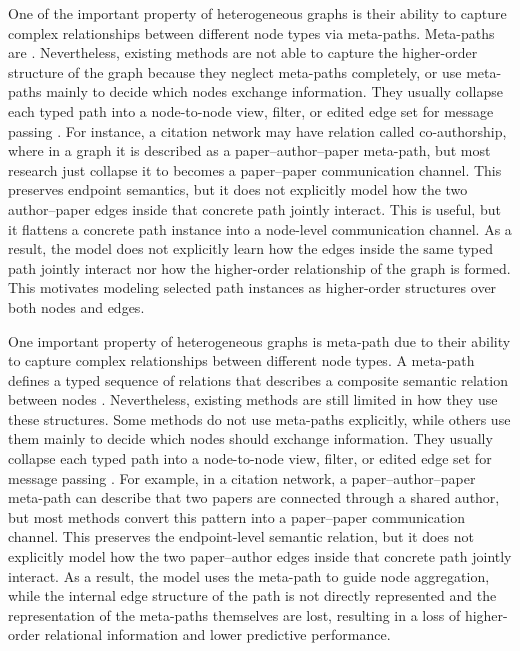 One of the important property of heterogeneous graphs is their ability to capture complex relationships between different node types via meta-paths. Meta-paths are \cite{sun2011pathsim}. Nevertheless, existing methods are not able to capture the higher-order structure of the graph because they neglect meta-paths completely, or use meta-paths mainly to decide which nodes exchange information. They  usually collapse each typed path into a node-to-node view, filter, or edited edge set for message passing \cite{lu2026addressing,chen2025adaptive,li2025hetero2net,guo2023homophily,shen2025heterophily,wang2025homophily}. For instance, a citation network may have relation called co-authorship, where in a graph it is described as a paper--author--paper meta-path, but most research just collapse it to becomes a paper--paper communication channel. 
This preserves endpoint semantics, but it does not explicitly model how the two author--paper edges inside that concrete path jointly interact.  This is useful, but it flattens a concrete path instance into a node-level communication channel. As a result, the model does not explicitly learn how the edges inside the same typed path jointly interact nor how the higher-order relationship of the graph is formed. This motivates modeling selected path instances as higher-order structures over both nodes and edges.



One important property of heterogeneous graphs is meta-path due to  their ability to capture complex relationships between different node types. 
A meta-path defines a typed sequence of relations that describes a composite semantic relation between nodes \cite{sun2011pathsim}. 
Nevertheless, existing methods are still limited in how they use these structures. 
Some methods do not use meta-paths explicitly, while others use them mainly to decide which nodes should exchange information. 
They usually collapse each typed path into a node-to-node view, filter, or edited edge set for message passing \cite{lu2026addressing,chen2025adaptive,li2025hetero2net,guo2023homophily,shen2025heterophily,wang2025homophily}. 
For example, in a citation network, a paper--author--paper meta-path can describe that two papers are connected through a shared author, but most methods convert this pattern into a paper--paper communication channel. 
This preserves the endpoint-level semantic relation, but it does not explicitly model how the two paper--author edges inside that concrete path jointly interact. 
As a result, the model uses the meta-path to guide node aggregation, while the internal edge structure of the path is not directly represented and the representation of the meta-paths themselves are lost, resulting in a loss of higher-order relational information and lower predictive performance.

